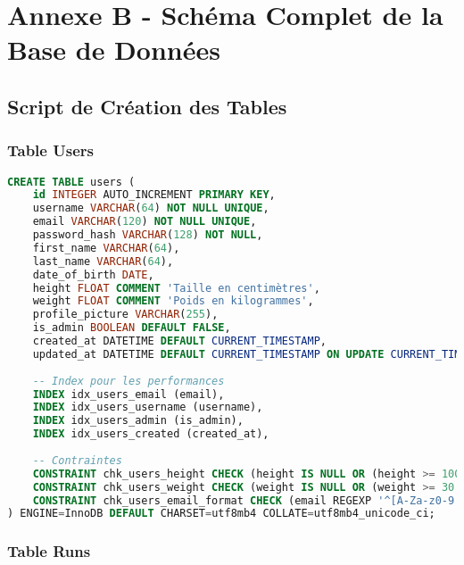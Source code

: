 \section{Annexe B - Schéma Complet de la Base de Données}

\subsection{Script de Création des Tables}

\subsubsection{Table Users}

\begin{lstlisting}[language=sql]
CREATE TABLE users (
    id INTEGER AUTO_INCREMENT PRIMARY KEY,
    username VARCHAR(64) NOT NULL UNIQUE,
    email VARCHAR(120) NOT NULL UNIQUE,
    password_hash VARCHAR(128) NOT NULL,
    first_name VARCHAR(64),
    last_name VARCHAR(64),
    date_of_birth DATE,
    height FLOAT COMMENT 'Taille en centimètres',
    weight FLOAT COMMENT 'Poids en kilogrammes',
    profile_picture VARCHAR(255),
    is_admin BOOLEAN DEFAULT FALSE,
    created_at DATETIME DEFAULT CURRENT_TIMESTAMP,
    updated_at DATETIME DEFAULT CURRENT_TIMESTAMP ON UPDATE CURRENT_TIMESTAMP,
    
    -- Index pour les performances
    INDEX idx_users_email (email),
    INDEX idx_users_username (username),
    INDEX idx_users_admin (is_admin),
    INDEX idx_users_created (created_at),
    
    -- Contraintes
    CONSTRAINT chk_users_height CHECK (height IS NULL OR (height >= 100 AND height <= 250)),
    CONSTRAINT chk_users_weight CHECK (weight IS NULL OR (weight >= 30 AND weight <= 200)),
    CONSTRAINT chk_users_email_format CHECK (email REGEXP '^[A-Za-z0-9._%+-]+@[A-Za-z0-9.-]+\.[A-Za-z]{2,}$')
) ENGINE=InnoDB DEFAULT CHARSET=utf8mb4 COLLATE=utf8mb4_unicode_ci;
\end{lstlisting}

\subsubsection{Table Runs}

